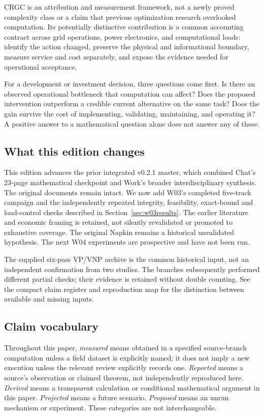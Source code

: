 \documentclass[11pt,letterpaper]{article}
\begin{document}
CRGC is an attribution and measurement framework, not a newly proved complexity class or a claim that previous optimization research overlooked computation. Its potentially distinctive contribution is a common accounting contract across grid operations, power electronics, and computational loads: identify the action changed, preserve the physical and informational boundary, measure service and cost separately, and expose the evidence needed for operational acceptance.

For a development or investment decision, three questions come first. Is there an observed operational bottleneck that computation can affect? Does the proposed intervention outperform a credible current alternative on the same task? Does the gain survive the cost of implementing, validating, maintaining, and operating it? A positive answer to a mathematical question alone does not answer any of these.

\subsection{What this edition changes}
This edition advances the prior integrated v0.2.1 master, which combined Chat's 23-page mathematical checkpoint and Work's broader interdisciplinary synthesis. The original documents remain intact. We now add W03's completed five-track campaign and the independently repeated integrity, feasibility, exact-bound and load-control checks described in Section~\ref{sec:w03results}. The earlier literature and economic framing is retained, not silently revalidated or promoted to exhaustive coverage. The original Napkin remains a historical unvalidated hypothesis. The next W04 experiments are prospective and have not been run.\cite{chatbranch,workbranch,w03packet,w03review}

The supplied six-pass VP/VNP archive is the common historical input, not an independent confirmation from two studies. The branches subsequently performed different partial checks; their evidence is retained without double counting. See the compact claim register and reproduction map for the distinction between available and missing inputs.

\subsection{Claim vocabulary}
Throughout this paper, \emph{measured} means obtained in a specified source-branch computation unless a field dataset is explicitly named; it does not imply a new execution unless the relevant review explicitly records one. \emph{Reported} means a source's observation or claimed theorem, not independently reproduced here. \emph{Derived} means a transparent calculation or conditional mathematical argument in this paper. \emph{Projected} means a future scenario. \emph{Proposed} means an unrun mechanism or experiment. These categories are not interchangeable.
\end{document}
